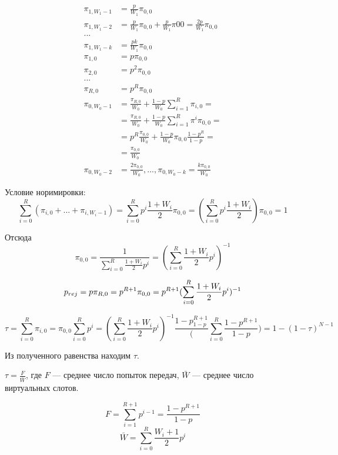 \begin{align*}
\pi_{1,W_1-1}   &= \frac{p}{W_1} \pi_{0,0} \\
\pi_{1,W_1-2}   &= \frac{p}{W_1} \pi_{0,0} + \frac{p}{W_1} \pi{00} = \frac{2p}{W_1}\pi_{0,0} \\
... \\
\pi_{1,W_1-k}   &= \frac{pk}{W_1} \pi_{0,0} \\
\pi_{1,0}       &= p \pi_{0,0} \\
\pi_{2,0}       &= p^2 \pi_{0,0} \\
... \\
\pi_{R,0}       &= p^R \pi_{0,0} \\
\pi_{0,W_0 - 1} &=     \frac{\pi_{R,0}}{W_0} + \frac{1 - p}{W_0} \sum_{i=1}^R \pi_{i,0} = \\
                &=     \frac{\pi_{R,0}}{W_0} + \frac{1 - p}{W_0} \sum_{i=1}^R \pi^i \pi_{0,0} = \\
                &= p^R \frac{\pi_{0,0}}{W_0} + \frac{1 - p}{W_0} \pi_{0,0} \frac{1 - p^R}{1 - p} = \\
                &= \frac{\pi_{0,0}}{W_0} \\
\pi_{0,W_0 - 2} &= \frac{2 \pi_{0,0}}{W_0}, ..., \pi_{0,W_0 - k} = \frac{k \pi_{0,0}}{W_0}
\end{align*}

Условие норимировки:
\[
\sum_{i=0}^R (\pi_{i,0} + ... + \pi_{i,W_i-1}) =
\sum_{i=0}^R p^i \frac{1 + W_i}{2} \pi_{0,0} =
(\sum_{i=0}^R p^i \frac{1 + W_i}{2}) \pi_{0,0} = 1
\]

Отсюда
\[
\pi_{0,0} = \frac{1}{\sum_{i=0}^R \frac{1 + W_i}{2} p^i} = (\sum_{i=0}^R \frac{1 + W_i}{2} p^i)^{-1}
\]

\[
p_{rej} = p \pi_{R,0} = p^{R+1} \pi_{0,0} = p^{R+1} (\sum_{i=0}^R \frac{1 + W_i}{2} p^i)^{-1}
\]

\[
\tau = \sum_{i = 0}^R \pi_{i,0} = \pi_{0,0} \sum_{i=0}^R p^i = (\sum_{i = 0}^R \frac{1 + W_i}{2} p^i)^{-1} \frac{1 - p^{R+1}_{1-p}} (\sum_{i=0}^R \frac{1 - p^{R+1}}{1-p}) = 1 - (1 - \tau)^{N - 1}
\]

Из полученного равенства находим $\tau$.

$\tau = \frac{F}{\bar{W}}$, где $F$ --- среднее число попыток передач, $\bar{W}$ --- среднее число виртуальных слотов.

\[
F = \sum_{i=1}^{R+1} p^{i-1} = \frac{1-p^{R+1}}{1 - p}
\]
\[
\bar{W} = \sum_{i=0}^R \frac{W_i+1}{2} p^i
\]
